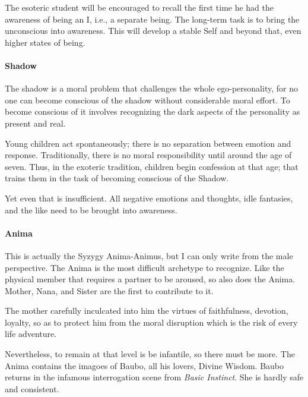 The esoteric student will be encouraged to recall the first time he had the awareness of being an I, i.e., a separate being. The long-term task is to bring the unconscious into awareness. This will develop a stable Self and beyond that, even higher states of being.

\paragraph{Shadow}
\begin{quotex}
The shadow is a moral problem that challenges the whole ego-personality, for no one can become conscious of the shadow without considerable moral effort. To become conscious of it involves recognizing the dark aspects of the personality as present and real. 

\end{quotex}
Young children act spontaneously; there is no separation between emotion and response. Traditionally, there is no moral responsibility until around the age of seven. Thus, in the exoteric tradition, children begin confession at that age; that trains them in the task of becoming conscious of the Shadow.

Yet even that is insufficient. All negative emotions and thoughts, idle fantasies, and the like need to be brought into awareness.

\paragraph{Anima}
This is actually the Syzygy Anima-Animus, but I can only write from the male perspective. The Anima is the most difficult archetype to recognize. Like the physical member that requires a partner to be aroused, so also does the Anima. Mother, Nana, and Sister are the first to contribute to it.

\begin{quotex}
The mother carefully inculcated into him the virtues of faithfulness, devotion, loyalty, so as to protect him from the moral disruption which is the risk of every life adventure. 

\end{quotex}
Nevertheless, to remain at that level is be infantile, so there must be more. The Anima contains the imagoes of Baubo, all his lovers, Divine Wisdom. Baubo returns in the infamous interrogation scene from \emph{Basic Instinct}. She is hardly safe and consistent.

